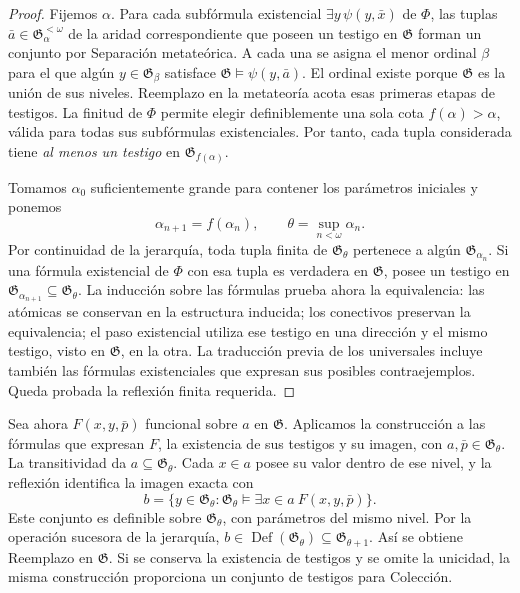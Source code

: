 \begin{proof}
Fijemos \(\alpha\). Para cada subfórmula existencial
\(\exists y\,\psi(y,\bar x)\) de \(\Phi\), las tuplas
\(\bar a\in\mathfrak G_\alpha^{<\omega}\) de la aridad correspondiente
que poseen un testigo en \(\mathfrak G\) forman un conjunto por Separación
metateórica. A cada una se asigna el menor ordinal \(\beta\) para el que
algún \(y\in\mathfrak G_\beta\) satisface
\(\mathfrak G\models\psi(y,\bar a)\). El ordinal existe porque
\(\mathfrak G\) es la unión de sus niveles. Reemplazo en la metateoría
acota esas primeras etapas de testigos. La finitud de \(\Phi\) permite
elegir definiblemente una sola cota \(f(\alpha)>\alpha\), válida para
todas sus subfórmulas existenciales. Por tanto, cada tupla considerada tiene
\emph{al menos un testigo} en \(\mathfrak G_{f(\alpha)}\).

Tomamos \(\alpha_0\) suficientemente grande para contener los parámetros
iniciales y ponemos
\[
 \alpha_{n+1}=f(\alpha_n),\qquad
 \theta=\sup_{n<\omega}\alpha_n.
\]
Por continuidad de la jerarquía, toda tupla finita de
\(\mathfrak G_\theta\) pertenece a algún \(\mathfrak G_{\alpha_n}\).
Si una fórmula existencial de \(\Phi\) con esa tupla es verdadera en
\(\mathfrak G\), posee un testigo en
\(\mathfrak G_{\alpha_{n+1}}\subseteq\mathfrak G_\theta\).
La inducción sobre las fórmulas prueba ahora la equivalencia: las atómicas
se conservan en la estructura inducida; los conectivos preservan la
equivalencia; el paso existencial utiliza ese testigo en una dirección y el
mismo testigo, visto en \(\mathfrak G\), en la otra. La traducción previa
de los universales incluye también las fórmulas existenciales que expresan
sus posibles contraejemplos. Queda probada la reflexión finita requerida.
\end{proof}

Sea ahora \(F(x,y,\bar p)\) funcional sobre \(a\) en \(\mathfrak G\).
Aplicamos la construcción a las fórmulas que expresan \(F\), la existencia
de sus testigos y su imagen, con \(a,\bar p\in\mathfrak G_\theta\).
La transitividad da \(a\subseteq\mathfrak G_\theta\). Cada
\(x\in a\) posee su valor dentro de ese nivel, y la reflexión identifica
la imagen exacta con
\[
 b=\{y\in\mathfrak G_\theta:
       \mathfrak G_\theta\models
       \exists x\in a\ F(x,y,\bar p)\}.
\]
Este conjunto es definible sobre \(\mathfrak G_\theta\), con parámetros
del mismo nivel. Por la operación sucesora de la jerarquía,
\(b\in\operatorname{Def}(\mathfrak G_\theta)
\subseteq\mathfrak G_{\theta+1}\). Así se obtiene Reemplazo en
\(\mathfrak G\). Si se conserva la existencia de testigos y se omite la
unicidad, la misma construcción proporciona un conjunto de testigos para
Colección.


